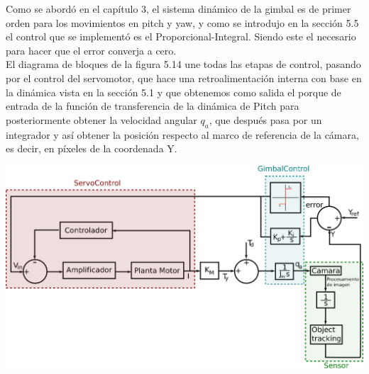 Como se abordó en el capítulo 3, el sistema dinámico de la gimbal es de primer orden para los movimientos en pitch y yaw, y como se introdujo en la sección 5.5
el control que se implementó es el Proporcional-Integral. Siendo este el necesario para hacer que el error converja a cero.\\
El diagrama de bloques de la figura 5.14 une todas las etapas de control, pasando por el control del servomotor, que hace una retroalimentación interna con base
en la dinámica vista en la sección 5.1 y que obtenemos como salida el porque de entrada de la función de transferencia de la dinámica de Pitch para posteriormente
obtener la velocidad angular $q_a$, que después pasa por un integrador y así obtener la posición respecto al marco de referencia de la cámara, es decir, en
píxeles de la coordenada Y.
\begin{center}
	\includegraphics[width=1.0\textwidth]{Contenido/Cuerpo/Capitulo5/Fig22.eps}
	\label{Fig4}
\end{center}

